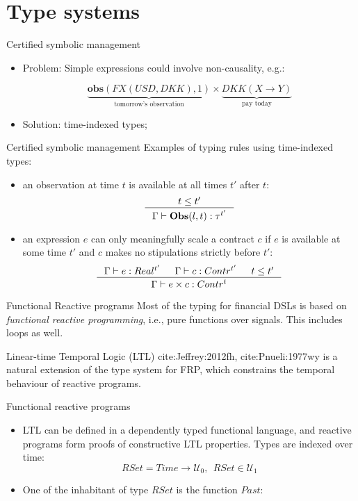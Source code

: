 \documentclass[aspectratio=169]{beamer}
\newcommand{\describe}[2]{\underbrace{#1}_{\text{#2}}}
\newcommand{\univ}[1]{\mathcal{U}_{#1}}
\begin{document}
\section{Type systems}
\label{sec:orge94b8fc}
\begin{frame}[label={sec:org0e73ba2}]{Certified symbolic management}
\begin{itemize}
\item \alert{Problem}: Simple expressions could involve non-causality, e.g.:

$$\describe{\textbf{obs}(FX(USD, DKK), 1)}{tomorrow's observation} \times \describe{DKK(X \rightarrow Y)}{pay today}$$

\item \alert{Solution}: time-indexed types;
\end{itemize}
\end{frame}

\begin{frame}[label={sec:org09cc5d3}]{Certified symbolic management}
\alert{Examples} of typing rules using time-indexed types:

\begin{itemize}
\item an observation at time \(t\) is available at all times \(t'\) after \(t\):
$$\inference{t \leq t'}{\Gamma |- \textbf{Obs}(l,t) : \tau^{t'}}$$

\item an expression \(e\) can only meaningfully scale a contract \(c\) if \(e\) is
available at some time \(t'\) and \(c\) makes no stipulations strictly before
\(t'\): $$\inference{\Gamma |- e: Real^{t'} & \Gamma |- c: Contr^{t'} & t \leq t'}{\Gamma |- e \times c:
  Contr^t}$$
\end{itemize}
\end{frame}

\begin{frame}[label={sec:org7e706b9}]{Functional Reactive programs}
Most of the typing for financial DSLs is based on \emph{functional reactive programming}, i.e.,
pure functions over signals. This includes loops as well.

Linear-time Temporal Logic (LTL) cite:Jeffrey:2012fh, cite:Pnueli:1977wy is a
natural extension of the type system for FRP, which constrains the temporal
behaviour of reactive programs.
\end{frame}

\begin{frame}[label={sec:org465e8e2}]{Functional reactive programs}
\begin{itemize}
\item LTL can be defined in a dependently typed functional language, and
reactive programs form proofs of constructive LTL properties.
Types are \alert{indexed} over time: $$RSet = Time \rightarrow \univ{0}, ~~ RSet \in \univ{1}$$
\end{itemize}


\begin{itemize}
\item One of the inhabitant of type \(RSet\) is the function \(Past\):
\end{itemize}
\end{frame}
\end{document}
